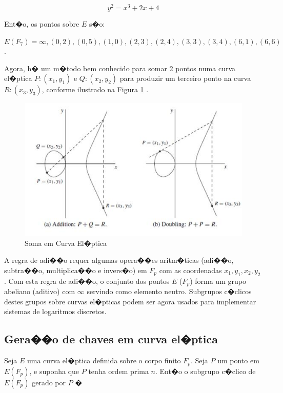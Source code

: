 \documentclass[a4paper,capchap,espacoduplo,normaltoc]{abntepusp}
\begin{document}
\begin{equation}
\label{eq:defcurvaeliptica2}
y^2= x^3+ 2x+4
\end{equation}

 Ent�o, os pontos sobre $E$ s�o:

$E(F_{7}) = { \infty, (0,2), (0,5), (1,0), (2,3), (2,4), (3,3), (3,4), (6,1), (6,6) }$.

Agora, h� um m�todo bem conhecido para somar 2 pontos numa curva el�ptica $P: (x_{1}, y_{1})$ e $Q: (x_{2}, y_{2})$ para produzir um terceiro ponto na curva $R: (x_{3}, y_{3})$, conforme ilustrado na Figura \ref{fig:somaeliptica} \cite{menezes}.

\begin{figure}[h]
	\centering
		\includegraphics[width=1.00\textwidth]{figuras/SomaEliptica.PNG}
	\caption{Soma em Curva El�ptica}
	\label{fig:somaeliptica}
\end{figure}

A regra de adi��o requer algumas opera��es aritm�ticas (adi��o, subtra��o, multiplica��o e invers�o) em $F_{p}$ com as coordenadas $x_{1}, y_{1}, x_{2}, y_{2}$. Com esta regra de adi��o, o conjunto dos pontos $E$ ($F_{p}$) forma um grupo abeliano (aditivo) com $\infty$ servindo como elemento neutro. Subgrupos c�clicos destes grupos sobre curvas el�pticas podem ser agora usados para implementar sistemas de logaritmos discretos.

\subsection{Gera��o de chaves em curva el�ptica}

Seja $E$ uma curva el�ptica definida sobre o corpo finito $F_{p}$. Seja $P$ um ponto em $E(F_{p})$, e suponha que $P$ tenha ordem prima $n$. Ent�o o subgrupo c�clico de $E(F_{p})$ gerado por $P$ � 
\end{document}
